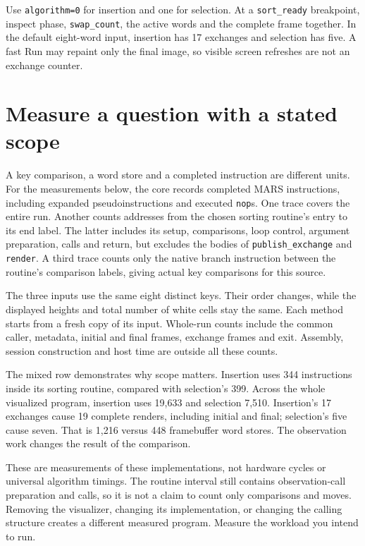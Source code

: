 Use \texttt{algorithm=0} for insertion and one for selection. At a
\texttt{sort\_ready} breakpoint, inspect phase, \texttt{swap\_count}, the active
words and the complete frame together. In the default eight-word input, insertion
has 17 exchanges and selection has five. A fast Run may repaint only the final
image, so visible screen refreshes are not an exchange counter.

\section{Measure a question with a stated scope}

A key comparison, a word store and a completed instruction are different units.
For the measurements below, the core records completed MARS instructions, including
expanded pseudoinstructions and executed \texttt{nop}s. One trace covers the entire
run. Another counts addresses from the chosen sorting routine's entry to its end
label. The latter includes its setup, comparisons, loop control, argument preparation,
calls and return, but excludes the bodies of \texttt{publish\_exchange} and
\texttt{render}. A third trace counts only the native branch instruction between
the routine's comparison labels, giving actual key comparisons for this source.



The three inputs use the same eight distinct keys. Their order changes, while
the displayed heights and total number of white cells stay the same. Each method
starts from a fresh copy of its input. Whole-run counts include the common caller,
metadata, initial and final frames, exchange frames and exit. Assembly, session
construction and host time are outside all these counts.

The mixed row demonstrates why scope matters. Insertion uses 344 instructions
inside its sorting routine, compared with selection's 399. Across the whole
visualized program, insertion uses 19,633 and selection 7,510. Insertion's 17
exchanges cause 19 complete renders, including initial and final; selection's five
cause seven. That is 1,216 versus 448 framebuffer word stores. The observation
work changes the result of the comparison.

These are measurements of these implementations, not hardware cycles or universal
algorithm timings. The routine interval still contains observation-call preparation
and calls, so it is not a claim to count only comparisons and moves. Removing the
visualizer, changing its implementation, or changing the calling structure creates
a different measured program. Measure the workload you intend to run.

